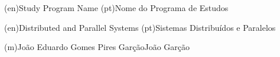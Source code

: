 %
%
%
%
\ntdegreename(en){Study Program Name}          %
\ntdegreename(pt){Nome do Programa de Estudos} %



%
%
%
%
\ntspecialization(en){Distributed and Parallel Systems}         %
\ntspecialization(pt){Sistemas Distribuídos e Paralelos}        %



%
%
\ntauthorname(m){João Eduardo Gomes Pires Garção}{João Garção}



